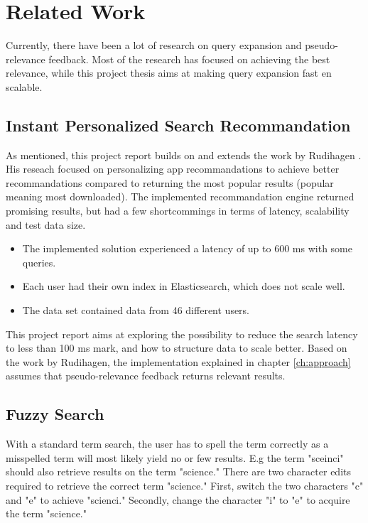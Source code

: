 \chapter{Related Work}
\label{ch:related-work}
Currently, there have been a lot of research on query expansion and pseudo-relevance feedback.
Most of the research has focused on achieving the best relevance,
while this project thesis aims at making query expansion fast en scalable.

\section{Instant Personalized Search Recommandation}
As mentioned, this project report builds on and extends the work by Rudihagen \cite{master-thesis}.
His reseach focused on personalizing app recommandations to achieve better recommandations compared to returning the most popular results (popular meaning most downloaded).
The implemented recommandation engine returned promising results, but had a few shortcommings in terms of latency, scalability and test data size.

\begin{itemize}
  \item The implemented solution experienced a latency of up to 600 ms with some queries.
  \item Each user had their own index in Elasticsearch, which does not scale well.
  \item The data set contained data from 46 different users.
\end{itemize}

This project report aims at exploring the possibility to reduce the search latency to less than 100 ms mark, and how to structure data to scale better.
Based on the work by Rudihagen,
the implementation explained in chapter \ref{ch:approach} assumes that pseudo-relevance feedback returns relevant results.

\section{Fuzzy Search}
With a standard term search, the user has to spell the term correctly as a misspelled term will most likely yield no or few results.
E.g the term "sceinci" should also retrieve results on the term "science."
There are two character edits required to retrieve the correct term "science."
First, switch the two characters "c" and "e" to achieve "scienci."
Secondly, change the character "i" to "e" to acquire the term "science."

